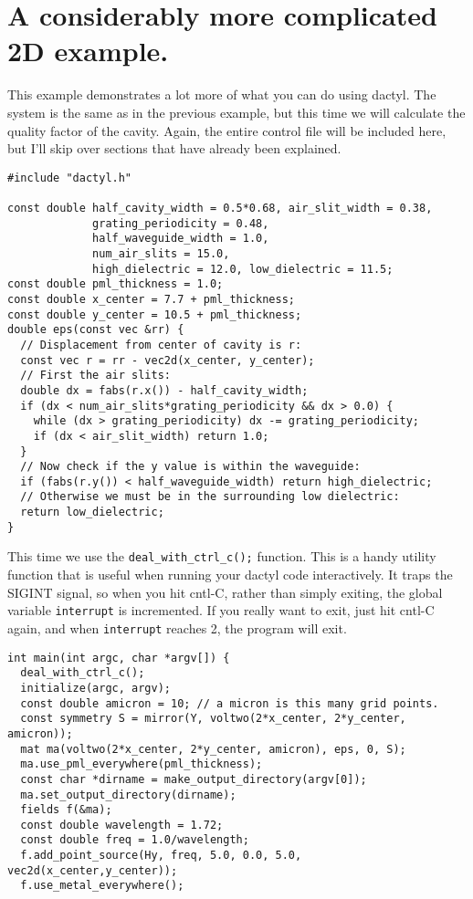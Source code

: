 \begin{comment}
/*
\end{comment}
\section{A considerably more complicated 2D example.}
\begin{comment}
*/
\end{comment}

This example demonstrates a lot more of what you can do using dactyl.  The
system is the same as in the previous example, but this time we will
calculate the quality factor of the cavity.  Again, the entire control file
will be included here, but I'll skip over sections that have already been
explained.

\begin{verbatim}
#include "dactyl.h"

const double half_cavity_width = 0.5*0.68, air_slit_width = 0.38,
             grating_periodicity = 0.48,
             half_waveguide_width = 1.0,
             num_air_slits = 15.0,
             high_dielectric = 12.0, low_dielectric = 11.5;
const double pml_thickness = 1.0;
const double x_center = 7.7 + pml_thickness;
const double y_center = 10.5 + pml_thickness;
double eps(const vec &rr) {
  // Displacement from center of cavity is r:
  const vec r = rr - vec2d(x_center, y_center);
  // First the air slits:
  double dx = fabs(r.x()) - half_cavity_width;
  if (dx < num_air_slits*grating_periodicity && dx > 0.0) {
    while (dx > grating_periodicity) dx -= grating_periodicity;
    if (dx < air_slit_width) return 1.0;
  }
  // Now check if the y value is within the waveguide:
  if (fabs(r.y()) < half_waveguide_width) return high_dielectric;
  // Otherwise we must be in the surrounding low dielectric:
  return low_dielectric;
}
\end{verbatim}
This time we use the \verb!deal_with_ctrl_c();! function.  This is a handy
utility function that is useful when running your dactyl code
interactively.  It traps the SIGINT signal, so when you hit cntl-C, rather
than simply exiting, the global variable \verb!interrupt! is incremented.
If you really want to exit, just hit cntl-C again, and when
\verb!interrupt! reaches 2, the program will exit.
\begin{verbatim}
int main(int argc, char *argv[]) {
  deal_with_ctrl_c();
  initialize(argc, argv);
  const double amicron = 10; // a micron is this many grid points.
  const symmetry S = mirror(Y, voltwo(2*x_center, 2*y_center, amicron));
  mat ma(voltwo(2*x_center, 2*y_center, amicron), eps, 0, S);
  ma.use_pml_everywhere(pml_thickness);
  const char *dirname = make_output_directory(argv[0]);
  ma.set_output_directory(dirname);
  fields f(&ma);
  const double wavelength = 1.72;
  const double freq = 1.0/wavelength;
  f.add_point_source(Hy, freq, 5.0, 0.0, 5.0, vec2d(x_center,y_center));
  f.use_metal_everywhere();
\end{verbatim}
